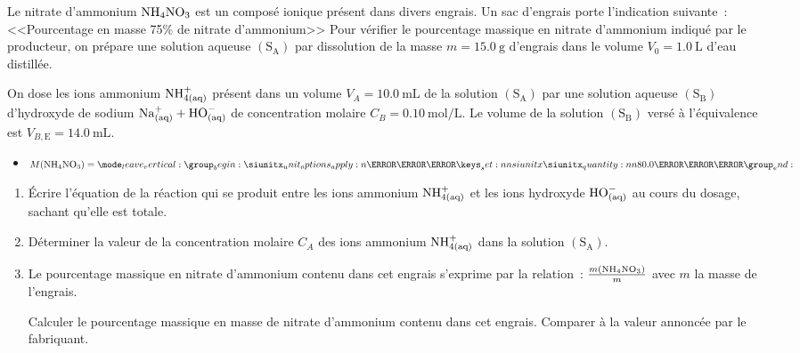 Le nitrate d'ammonium $\ce{NH4NO3}$ est un composé ionique présent dans divers
engrais. Un sac d'engrais porte l'indication suivante~: <<Pourcentage en masse
75\% de nitrate d'ammonium>> Pour vérifier le pourcentage massique en nitrate
d'ammonium indiqué par le producteur, on prépare une solution aqueuse
$\mathrm{(S_{A})}$ par dissolution de la masse $m=\qty{15.0}{\g}$ d'engrais
dans le volume $V_{0}=\qty{1.0}{\L}$ d'eau distillée.

On dose les ions ammonium $\ce{NH^+_{4(aq)}}$ présent dans un volume
$V_{A}=\qty{10.0}{\mL}$ de la solution $\mathrm{(S_{A})}$ par une solution
aqueuse $\mathrm{(S_{B})}$ d'hydroxyde de sodium
$\ce{Na^+_{(aq)} + HO^-_{(aq)}}$ de concentration molaire
$C_{B}=\qty{0.10}{\mol\per\L}$. Le volume de la solution $\mathrm{(S_{B})}$
versé à l'équivalence est $V_{B,\mathrm{E}}=\qty{14.0}{\mL}$.

\begin{donnees}
    \begin{itemize}
        \item $M(\ce{NH4NO3})=\qty{80.0}{\g\per\mol}$
    \end{itemize}
\end{donnees}

\begin{enumerate}
    \item Écrire l'équation de la réaction qui se produit entre les ions
          ammonium $\ce{NH^+_{4(aq)}}$ et les ions hydroxyde $\ce{HO^-_{(aq)}}$
          au cours du dosage, sachant qu'elle est totale.
    \item Déterminer la valeur de la concentration molaire $C_{A}$ des ions
          ammonium $\ce{NH^+_{4(aq)}}$ dans la solution $\mathrm{(S_{A})}$.
    \item Le pourcentage massique en nitrate d'ammonium contenu dans cet engrais
          s'exprime par la relation~: $\frac{m(\ce{NH4NO3})}{m}$ avec $m$
          la masse de l'engrais.
    
          Calculer le pourcentage massique en masse de nitrate d'ammonium
          contenu dans cet engrais. Comparer à la valeur annoncée par le
          fabriquant.
\end{enumerate}

